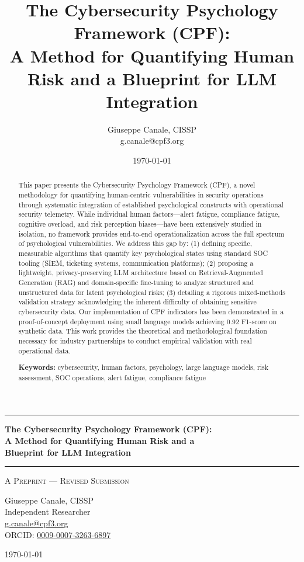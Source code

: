 \documentclass[11pt, a4paper]{article}
\title{The Cybersecurity Psychology Framework (CPF): \\ A Method for Quantifying Human Risk and a Blueprint for LLM Integration}
\author{Giuseppe Canale, CISSP \\ g.canale@cpf3.org}
\date{\today}
\begin{document}
\thispagestyle{empty}
\begin{center}
\vspace*{0.5cm}
\rule{\textwidth}{1.5pt}
\vspace{0.5cm}

{\LARGE \textbf{The Cybersecurity Psychology Framework (CPF):}}\\[0.3cm]
{\LARGE \textbf{A Method for Quantifying Human Risk and a}}\\[0.3cm]
{\LARGE \textbf{Blueprint for LLM Integration}}

\vspace{0.5cm}
\rule{\textwidth}{1.5pt}
\vspace{0.3cm}

{\large \textsc{A Preprint — Revised Submission}}

\vspace{0.5cm}

{\Large Giuseppe Canale, CISSP}\\[0.2cm]
Independent Researcher\\[0.1cm]
\href{mailto:g.canale@cpf3.org}{g.canale@cpf3.org} \\[0.1cm]
ORCID: \href{https://orcid.org/0009-0007-3263-6897}{0009-0007-3263-6897}

\vspace{0.8cm}
{\large \today}
\vspace{1cm}
\end{center}

\begin{abstract}
\noindent
This paper presents the Cybersecurity Psychology Framework (CPF), a novel methodology for quantifying human-centric vulnerabilities in security operations through systematic integration of established psychological constructs with operational security telemetry. While individual human factors—alert fatigue, compliance fatigue, cognitive overload, and risk perception biases—have been extensively studied in isolation, no framework provides end-to-end operationalization across the full spectrum of psychological vulnerabilities. We address this gap by: (1) defining specific, measurable algorithms that quantify key psychological states using standard SOC tooling (SIEM, ticketing systems, communication platforms); (2) proposing a lightweight, privacy-preserving LLM architecture based on Retrieval-Augmented Generation (RAG) and domain-specific fine-tuning to analyze structured and unstructured data for latent psychological risks; (3) detailing a rigorous mixed-methods validation strategy acknowledging the inherent difficulty of obtaining sensitive cybersecurity data. Our implementation of CPF indicators has been demonstrated in a proof-of-concept deployment using small language models achieving 0.92 F1-score on synthetic data. This work provides the theoretical and methodological foundation necessary for industry partnerships to conduct empirical validation with real operational data.

\vspace{0.5em}
\noindent\textbf{Keywords:} cybersecurity, human factors, psychology, large language models, risk assessment, SOC operations, alert fatigue, compliance fatigue
\end{abstract}
\end{document}
